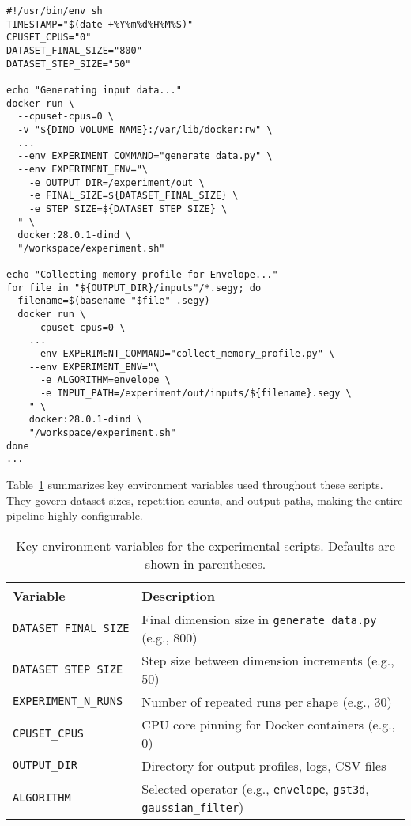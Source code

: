 \begin{lstlisting}[style=bashstyle,caption={Excerpts from \texttt{experiment.sh} orchestrating Docker-based runs. Variables like \texttt{DATASET\_FINAL\_SIZE} and \texttt{DATASET\_STEP\_SIZE} set shape range for dataset generation.}, label={lst:exp_sh}]
#!/usr/bin/env sh
TIMESTAMP="$(date +%Y%m%d%H%M%S)"
CPUSET_CPUS="0"
DATASET_FINAL_SIZE="800"
DATASET_STEP_SIZE="50"

echo "Generating input data..."
docker run \
  --cpuset-cpus=0 \
  -v "${DIND_VOLUME_NAME}:/var/lib/docker:rw" \
  ...
  --env EXPERIMENT_COMMAND="generate_data.py" \
  --env EXPERIMENT_ENV="\
    -e OUTPUT_DIR=/experiment/out \
    -e FINAL_SIZE=${DATASET_FINAL_SIZE} \
    -e STEP_SIZE=${DATASET_STEP_SIZE} \
  " \
  docker:28.0.1-dind \
  "/workspace/experiment.sh"

echo "Collecting memory profile for Envelope..."
for file in "${OUTPUT_DIR}/inputs"/*.segy; do
  filename=$(basename "$file" .segy)
  docker run \
    --cpuset-cpus=0 \
    ...
    --env EXPERIMENT_COMMAND="collect_memory_profile.py" \
    --env EXPERIMENT_ENV="\
      -e ALGORITHM=envelope \
      -e INPUT_PATH=/experiment/out/inputs/${filename}.segy \
    " \
    docker:28.0.1-dind \
    "/workspace/experiment.sh"
done
...
\end{lstlisting}

\noindent
Table~\ref{tab:env_vars} summarizes key environment variables used throughout these scripts.
They govern dataset sizes, repetition counts, and output paths, making the entire pipeline highly configurable.

\begin{table}[htbp]
    \centering
    \caption{Key environment variables for the experimental scripts.
    Defaults are shown in parentheses.
    \vspace{1em}}
    \label{tab:env_vars}
    \begin{tabular}{ll}
        \hline
        \textbf{Variable}             & \textbf{Description}                                                                   \\
        \hline
        \texttt{DATASET\_FINAL\_SIZE} & Final dimension size in \texttt{generate\_data.py} (e.g., 800)                         \\
        \texttt{DATASET\_STEP\_SIZE}  & Step size between dimension increments (e.g., 50)                                      \\
        \texttt{EXPERIMENT\_N\_RUNS}  & Number of repeated runs per shape (e.g., 30)                                           \\
        \texttt{CPUSET\_CPUS}         & CPU core pinning for Docker containers (e.g., 0)                                       \\
        \texttt{OUTPUT\_DIR}          & Directory for output profiles, logs, CSV files                                         \\
        \texttt{ALGORITHM}            & Selected operator (e.g., \texttt{envelope}, \texttt{gst3d}, \texttt{gaussian\_filter}) \\
        \hline
    \end{tabular}
\end{table}

